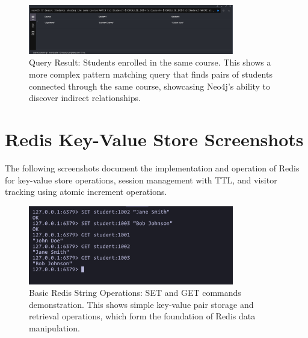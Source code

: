 \begin{figure}[H]
  \centering
  \includegraphics[width=0.8\textwidth]{task-3/screenshots/student-doing-same-course.png}
  \caption{Query Result: Students enrolled in the same course. This shows a more complex pattern matching query that finds pairs of students connected through the same course, showcasing Neo4j's ability to discover indirect relationships.}
  \label{fig:task3-same-course}
\end{figure}

\section{Redis Key-Value Store Screenshots}

The following screenshots document the implementation and operation of Redis for key-value store operations, session management with TTL, and visitor tracking using atomic increment operations.

\begin{figure}[H]
  \centering
  \includegraphics[width=0.8\textwidth]{task-4/screenshots/basic-set-get-operations.png}
  \caption{Basic Redis String Operations: SET and GET commands demonstration. This shows simple key-value pair storage and retrieval operations, which form the foundation of Redis data manipulation.}
  \label{fig:basic-set-get}
\end{figure}

